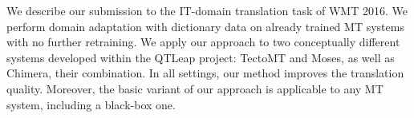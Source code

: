 We describe our submission to the IT-domain translation task of WMT 2016. We perform domain adaptation with dictionary data on already trained MT systems with no further retraining. We apply our approach to two conceptually different systems developed within the QTLeap project: TectoMT and Moses, as well as Chimera, their combination. In all settings, our method improves the translation quality. Moreover, the basic variant of our approach is applicable to any MT system, including a black-box one.
